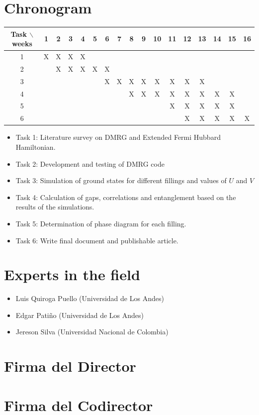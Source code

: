 \documentclass{article}
\begin{document}
\section{Chronogram}

\begin{table}[htb]
	\begin{tabular}{|c|cccccccccccccccc| }
	\hline
	Task $\backslash$ weeks & 1 & 2 & 3 & 4 & 5 & 6 & 7 & 8 & 9 & 10 & 11 & 12 & 13 & 14 & 15 & 16  \\
	\hline
	1 & X & X & X & X &   &   &   &  &  &   &   &   &   &   &   &   \\
	2 &   & X & X & X  & X & X &  &   &   &  &  &  &   &  &  &   \\
	3 &   &   &   &   &   & X  & X  & X & X  & X  & X  & X &  X &   &  &   \\
	4 &  &  &  &  &  &  &  & X & X & X &  X & X  &  X & X  &  X &   \\
	5 &   &   &   &   &  &   &   &   &  & &  X & X &  X & X & X &   \\
	6 &   &   &   &   &  &   &   &   &  &   &   & X &  X & X  & X & X  \\
	\hline
	\end{tabular}
\end{table}
\vspace{1mm}

\begin{itemize}
	\item Task 1: Literature survey on DMRG and Extended Fermi Hubbard Hamiltonian.
	\item Task 2: Development and testing of DMRG code 
	\item Task 3: Simulation of ground states for different fillings and values of $U$ and $V$
	\item Task 4: Calculation of gaps, correlations and entanglement based on the results of the simulations.
	\item Task 5: Determination of phase diagram for each filling.
	\item Task 6: Write final document and publishable article.
\end{itemize}

\section{Experts in the field}

\begin{itemize}
    \item Luis Quiroga Puello (Universidad de Los Andes)
    \item Edgar Patiño (Universidad de Los Andes)
    \item Jereson Silva (Universidad Nacional de Colombia)
\end{itemize}

\section*{Firma del Director}
\vspace{1.5cm}

\section*{Firma del Codirector}
\vspace{1.5cm}



\end{document}
